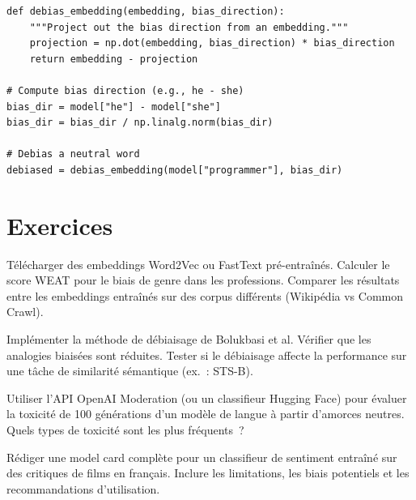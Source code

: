 \begin{codeblock}[title=\textbf{D\'ebiaisage g\'eom\'etrique}]
\begin{verbatim}
def debias_embedding(embedding, bias_direction):
    """Project out the bias direction from an embedding."""
    projection = np.dot(embedding, bias_direction) * bias_direction
    return embedding - projection

# Compute bias direction (e.g., he - she)
bias_dir = model["he"] - model["she"]
bias_dir = bias_dir / np.linalg.norm(bias_dir)

# Debias a neutral word
debiased = debias_embedding(model["programmer"], bias_dir)
\end{verbatim}
\end{codeblock}

\section{Exercices}
\label{sec:ethique:exercices}

\begin{exercice}
T\'el\'echarger des embeddings Word2Vec ou FastText pr\'e-entra\^in\'es.
Calculer le score WEAT pour le biais de genre dans les professions.
Comparer les r\'esultats entre les embeddings entra\^in\'es sur des
corpus diff\'erents (Wikip\'edia vs Common Crawl).
\end{exercice}

\begin{exercice}[D\'ebiaisage]
Impl\'ementer la m\'ethode de d\'ebiaisage de Bolukbasi et al.
V\'erifier que les analogies biais\'ees sont r\'eduites. Tester si
le d\'ebiaisage affecte la performance sur une t\^ache de similarit\'e
s\'emantique (ex.~: STS-B).
\end{exercice}

\begin{exercice}
Utiliser l'API OpenAI Moderation (ou un classifieur Hugging Face) pour
\'evaluer la toxicit\'e de 100 g\'en\'erations d'un mod\`ele de langue
\`a partir d'amorces neutres. Quels types de toxicit\'e sont les plus
fr\'equents~?
\end{exercice}

\begin{exercice}
R\'ediger une model card compl\`ete pour un classifieur de sentiment
entra\^in\'e sur des critiques de films en fran\c{c}ais. Inclure les
limitations, les biais potentiels et les recommandations d'utilisation.
\end{exercice}
